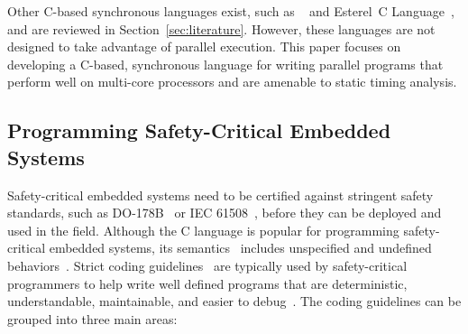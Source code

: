 Other C-based synchronous languages exist, such as \synchronousc{}~\cite{timed_synccharts_c_proposal}
and Esterel~C Language~\cite{timed_ecl},
and are reviewed in Section~\ref{sec:literature}. 
However, these languages are not designed to take advantage 
of parallel execution. This paper focuses on developing a C-based,
synchronous language for writing parallel programs that
perform well on multi-core processors and are amenable to 
static timing analysis. 

\subsection{Programming Safety-Critical Embedded Systems}
\label{sec:introduction:programming_safety}
Safety-critical embedded systems need to be 
certified against stringent safety standards, such as 
DO-178B~\cite{DO-178B} or IEC 61508~\cite{IEC61508}, before
they can be deployed and used in the field.
Although the C language is popular for programming safety-critical embedded systems, 
its semantics~\cite{programming_languages_c11} includes unspecified 
and undefined behaviors~\cite{safety_critical_coding_traps_pitfalls}. Strict 
coding guidelines~\cite{safety_critical_coding_misrac_standard,safety_critical_coding_power_10,safety_critical_coding_jpl} 
are typically used by safety-critical programmers to help write well 
defined programs that are deterministic, understandable, maintainable, 
and easier to debug~\cite{safety_critical_coding_structure,safety_critical_coding_misrac_overview}. 
The coding guidelines can be grouped into three main areas: 

